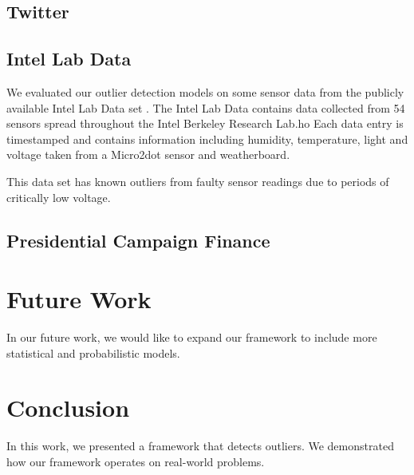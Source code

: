 \documentclass{vldb}
\begin{document}
\subsection{Twitter}

\subsection{Intel Lab Data}
We evaluated our outlier detection models on some sensor data from the publicly available Intel Lab Data set \cite{IntelLabData}.
The Intel Lab Data contains data collected from 54 sensors spread throughout the Intel Berkeley Research Lab.ho
Each data entry is timestamped and contains information including humidity, temperature, light and voltage taken from a Micro2dot sensor and weatherboard.

This data set has known outliers from faulty sensor readings due to periods of critically low voltage.

\subsection{Presidential Campaign Finance}
\cite{PresCampaignData}

\section{Future Work}

In our future work, we would like to expand our framework to include more statistical and probabilistic models.

\section{Conclusion}

In this work, we presented a framework that detects outliers.
We demonstrated how our framework operates on real-world problems.






\end{document}
